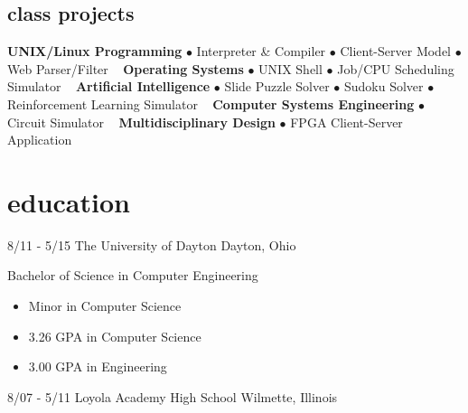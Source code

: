 \documentclass[print]{friggeri-cv}
\begin{document}
\begin{aside}
\section{class projects} 
\textbf{UNIX/Linux Programming}
$\bullet$ Interpreter \& Compiler
$\bullet$ Client-Server Model
$\bullet$ Web Parser/Filter
~
\textbf{Operating Systems}
$\bullet$ UNIX Shell
$\bullet$ Job/CPU Scheduling Simulator
~
\textbf{Artificial Intelligence}
$\bullet$ Slide Puzzle Solver
$\bullet$ Sudoku Solver 
$\bullet$ Reinforcement Learning Simulator
~
\textbf{Computer Systems Engineering}
$\bullet$ Circuit Simulator
~
\textbf{Multidisciplinary Design}
$\bullet$ FPGA Client-Server Application
\end{aside}

\section{education}
\begin{entrylist}

\entry
{8/11 - 5/15}
{The University of Dayton}
{Dayton, Ohio}		
{
Bachelor of Science in Computer Engineering
\begin{itemize}
	\item Minor in Computer Science
	\item 3.26 GPA in Computer Science
	\item 3.00 GPA in Engineering
\end{itemize}
}

\entry
{8/07 - 5/11}
{Loyola Academy High School}
{Wilmette, Illinois}
{}

\end{entrylist}
\end{document}
